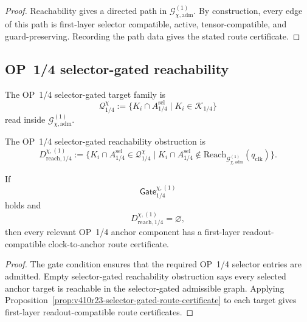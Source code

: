 \begin{proof}
Reachability gives a directed path in
\(\mathcal G_{\chi,\mathrm{adm}}^{(1)}\). By construction, every edge of this
path is first-layer selector compatible, active, tensor-compatible, and
guard-preserving. Recording the path data gives the stated route certificate.
\end{proof}

\subsection{OP~1/4 selector-gated reachability}
\label{subsec:v410r23-op14-selector-gated-reachability}

\begin{definition}
\label{def:v410r23-op14-selector-gated-target-family}
The OP~1/4 selector-gated target family is
\[
 \mathcal Q_{1/4}^{\chi}
 :=
 \{K_i\cap A_{1/4}^{\mathrm{sel}}\mid K_i\in\mathcal K_{1/4}\}
\]
read inside \(\mathcal G_{\chi,\mathrm{adm}}^{(1)}\).
\end{definition}

\begin{definition}
\label{def:v410r23-op14-selector-gated-reachability-obstruction}
The OP~1/4 selector-gated reachability obstruction is
\[
 D_{\mathrm{reach},1/4}^{\chi,(1)}
 :=
 \{K_i\cap A_{1/4}^{\mathrm{sel}}\in\mathcal Q_{1/4}^{\chi}
 \mid
 K_i\cap A_{1/4}^{\mathrm{sel}}\notin
 \mathrm{Reach}_{\mathcal G_{\chi,\mathrm{adm}}^{(1)}}(q_{\mathrm{clk}})\}.
\]
\end{definition}

\begin{proposition}
\label{prop:v410r23-op14-first-selector-gated-reachability-pass}
If
\[
 \mathsf{Gate}_{1/4}^{\chi,(1)}
\]
holds and
\[
 D_{\mathrm{reach},1/4}^{\chi,(1)}=\varnothing,
\]
then every relevant OP~1/4 anchor component has a first-layer
readout-compatible clock-to-anchor route certificate.
\end{proposition}

\begin{proof}
The gate condition ensures that the required OP~1/4 selector entries are
admitted. Empty selector-gated reachability obstruction says every selected
anchor target is reachable in the selector-gated admissible graph. Applying
Proposition~\ref{prop:v410r23-selector-gated-route-certificate} to each target
gives first-layer readout-compatible route certificates.
\end{proof}

